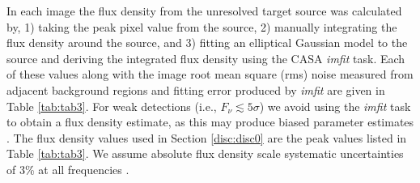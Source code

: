 \documentclass[iop]{emulateapj}
\begin{document}
In each image the flux density from the unresolved target source was calculated by, 1) taking the peak pixel value from the source, 2) manually integrating the flux density around the source, and 3) fitting an elliptical Gaussian model to the source and deriving the integrated flux density using the CASA \textit{imfit} task. Each of these values along with the image root mean square (rms) noise measured from adjacent background regions and fitting error produced by \textit{imfit} are given in Table \ref{tab:tab3}. For weak detections (i.e., $F_{\nu} \lesssim 5\sigma$) we avoid using the \textit{imfit} task to obtain a flux density estimate, as this may produce biased parameter estimates \citep{1999ASPC..180.....T}. The flux density values used in Section \ref{disc:disc0} are the peak values listed in Table \ref{tab:tab3}. We assume absolute flux density scale systematic uncertainties of  3\% at all frequencies \citep{2013ApJS..204...19P}.
\end{document}
